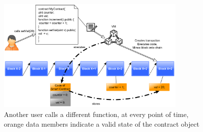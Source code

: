 \documentclass[a4paper]{article}
\begin{document}
\begin{figure}[H]
    \centering
    \includegraphics[width=0.83\textwidth]{figures/deploy_2.png}
    \caption{Another user calls a different function, at every point of time, orange data members indicate a valid state of the contract object}
    \label{fig:deploy_2}
\end{figure}

\end{document}
